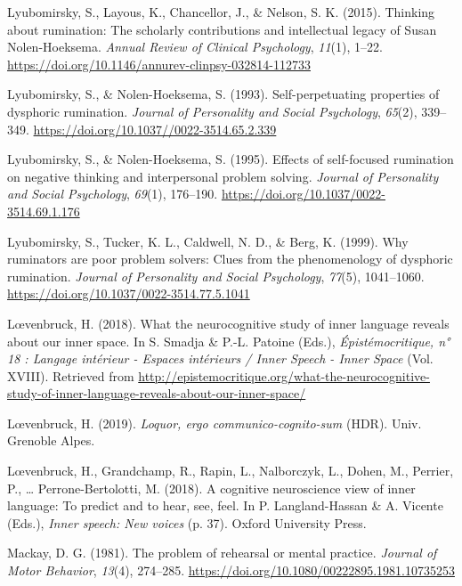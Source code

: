 \documentclass[a4paper,12pt,twoside,onecolumn,openright,final,oldfontcommands]{memoir}
\begin{document}
\leavevmode\hypertarget{ref-lyubomirsky_thinking_2015}{}%
Lyubomirsky, S., Layous, K., Chancellor, J., \& Nelson, S. K. (2015). Thinking about rumination: The scholarly contributions and intellectual legacy of Susan Nolen-Hoeksema. \emph{Annual Review of Clinical Psychology}, \emph{11}(1), 1--22. \url{https://doi.org/10.1146/annurev-clinpsy-032814-112733}

\leavevmode\hypertarget{ref-lyubomirsky_self-perpetuating_1993}{}%
Lyubomirsky, S., \& Nolen-Hoeksema, S. (1993). Self-perpetuating properties of dysphoric rumination. \emph{Journal of Personality and Social Psychology}, \emph{65}(2), 339--349. \url{https://doi.org/10.1037//0022-3514.65.2.339}

\leavevmode\hypertarget{ref-lyubomirsky_effects_1995}{}%
Lyubomirsky, S., \& Nolen-Hoeksema, S. (1995). Effects of self-focused rumination on negative thinking and interpersonal problem solving. \emph{Journal of Personality and Social Psychology}, \emph{69}(1), 176--190. \url{https://doi.org/10.1037/0022-3514.69.1.176}

\leavevmode\hypertarget{ref-lyubomirsky_why_1999}{}%
Lyubomirsky, S., Tucker, K. L., Caldwell, N. D., \& Berg, K. (1999). Why ruminators are poor problem solvers: Clues from the phenomenology of dysphoric rumination. \emph{Journal of Personality and Social Psychology}, \emph{77}(5), 1041--1060. \url{https://doi.org/10.1037/0022-3514.77.5.1041}

\leavevmode\hypertarget{ref-loevenbruck_what_2018}{}%
Lœvenbruck, H. (2018). What the neurocognitive study of inner language reveals about our inner space. In S. Smadja \& P.-L. Patoine (Eds.), \emph{Épistémocritique, n° 18 : Langage intérieur - Espaces intérieurs / Inner Speech - Inner Space} (Vol. XVIII). Retrieved from \url{http://epistemocritique.org/what-the-neurocognitive-study-of-inner-language-reveals-about-our-inner-space/}

\leavevmode\hypertarget{ref-loevenbruck_loquor_2019}{}%
Lœvenbruck, H. (2019). \emph{Loquor, ergo communico-cognito-sum} (HDR). Univ. Grenoble Alpes.

\leavevmode\hypertarget{ref-loevenbruck_cognitive_2018}{}%
Lœvenbruck, H., Grandchamp, R., Rapin, L., Nalborczyk, L., Dohen, M., Perrier, P., \ldots{} Perrone-Bertolotti, M. (2018). A cognitive neuroscience view of inner language: To predict and to hear, see, feel. In P. Langland-Hassan \& A. Vicente (Eds.), \emph{Inner speech: New voices} (p. 37). Oxford University Press.

\leavevmode\hypertarget{ref-mackay_problem_1981}{}%
Mackay, D. G. (1981). The problem of rehearsal or mental practice. \emph{Journal of Motor Behavior}, \emph{13}(4), 274--285. \url{https://doi.org/10.1080/00222895.1981.10735253}
\end{document}
